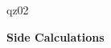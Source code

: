 \documentclass{article}
\begin{document}
\begin{exam}{qz02}
\begin{problem}[4]
\begin{workarea}{\sameVspace}
\begin{multicols}{2}
\vfil\vspace*{\sameVspace}\vfil


\columnbreak
\textbf{Side Calculations}

\vfil\vspace*{1.9in}\vfil

\end{multicols}
\end{workarea}

\end{problem}

\end{exam}
\end{document}
